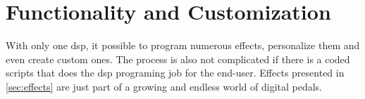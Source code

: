 \section{Functionality and Customization}

With only one \gls{dsp}, it possible to program numerous effects, personalize them and even create custom ones. The process is also not complicated if there is a coded scripts that does the \gls{dsp} programing job for the end-user. Effects presented in \autoref{sec:effects} are just part of a growing and endless world of digital pedals. 

 